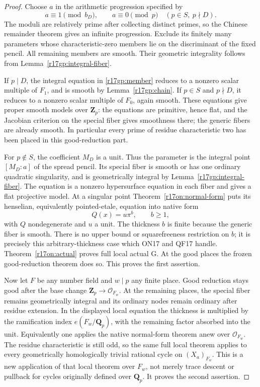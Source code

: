 \begin{proof}
Choose $a$ in the arithmetic progression specified by
\[
        a\equiv1\pmod{b_D},\qquad
        a\equiv0\pmod p\quad(p\in S,\ p\nmid D).
 \tag{GP17.5}\label{r17gp:parameter-crt}
\]
The moduli are relatively prime after collecting distinct
primes, so the Chinese remainder theorem gives an infinite
progression. Exclude its finitely many parameters whose
characteristic-zero members lie on the discriminant of the
fixed pencil. All remaining members are smooth. Their geometric
integrality follows from Lemma~\ref{r17gp:integral-fiber}.

If $p\mid D$, the integral equation in
\eqref{r17gp:member} reduces to a nonzero scalar multiple
of $F_1$, and is smooth by Lemma~\ref{r17gp:chain}.
If $p\in S$ and $p\nmid D$, it reduces to a nonzero scalar
multiple of $F_0$, again smooth. These equations give proper
smooth models over $\mathbf Z_p$: the equations are primitive,
hence flat, and the Jacobian criterion on the special fiber
gives smoothness there; the generic fibers are already smooth.
In particular every prime of residue characteristic two has
been placed in this good-reduction part.

For $p\notin S$, the coefficient $M_D$ is a unit. Thus the
parameter is the integral point $[M_D:a]$ of the spread pencil.
Its special fiber is smooth or has one ordinary quadratic
singularity, and is geometrically integral by
Lemma~\ref{r17gp:integral-fiber}. The equation is a nonzero
hypersurface equation in each fiber and gives a flat projective
model. At a singular point Theorem~\ref{r17on:normal-form}
puts its henselian, equivalently pointed-etale, equation into
native form
\[
                             Q(x)=u\pi^b,
                       \qquad b\ge1,
 \tag{GP17.6}\label{r17gp:thickness}
\]
with $Q$ nondegenerate and $u$ a unit. The thickness $b$ is
finite because the generic fiber is smooth. There is no upper
bound or squarefreeness restriction on $b$; it is precisely
this arbitrary-thickness case which ON17 and QF17 handle.
Theorem~\ref{r17on:actual} proves full local actual G.
At the good places the frozen good-reduction theorem does so.
This proves the first assertion.

Now let $F$ be any number field and $w\mid p$ any finite
place. Good reduction stays good after the base change
$\mathbf Z_p\to\mathcal O_{F_w}$. At the remaining places,
the special fiber remains geometrically integral and its
ordinary nodes remain ordinary after residue extension.
In the displayed local equation the thickness is multiplied
by the ramification index $e(F_w/\mathbf Q_p)$, with the
remaining factor absorbed into the unit. Equivalently one
applies the native normal-form theorem anew over
$\mathcal O_{F_w}$. The residue characteristic is still odd,
so the same full local theorem applies to every geometrically
homologically trivial rational cycle on $(X_a)_{F_w}$.
This is a new application of that local theorem over $F_w$,
not merely trace descent or pullback for cycles originally
defined over $\mathbf Q_p$. It proves the second assertion.


\end{proof}
